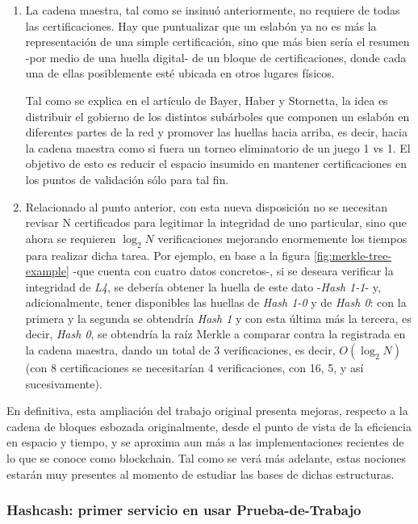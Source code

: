 \begin{enumerate}
  \item La cadena maestra, tal como se insinuó anteriormente, no requiere de todas las certificaciones. Hay que puntualizar que un eslabón ya no es más la representación de una simple certificación, sino que más bien sería el resumen -por medio de una huella digital- de un bloque de certificaciones, donde cada una de ellas posiblemente esté ubicada en otros lugares físicos.

    Tal como se explica en el artículo de Bayer, Haber y Stornetta, la idea es distribuir el gobierno de los distintos subárboles que componen un eslabón en diferentes partes de la red y promover las huellas hacia arriba, es decir, hacia la cadena maestra como si fuera un torneo eliminatorio de un juego 1 vs 1. El objetivo de esto es reducir el espacio insumido en mantener certificaciones en los puntos de validación sólo para tal fin.
  \item Relacionado al punto anterior, con esta nueva disposición no se necesitan revisar N certificados para legitimar la integridad de uno particular, sino que ahora se requieren $\log_2 N$ verificaciones mejorando enormemente los tiempos para realizar dicha tarea. Por ejemplo, en base a la figura \ref{fig:merkle-tree-example} -que cuenta con cuatro datos concretos-, si se deseara verificar la integridad de \textit{L4}, se debería obtener la huella de este dato -\textit{Hash 1-1}-  y, adicionalmente, tener disponibles las huellas de \textit{Hash 1-0} y de \textit{Hash 0}: con la primera y la segunda se obtendría \textit{Hash 1} y con esta última más la tercera, es decir, \textit{Hash 0}, se obtendría la raíz Merkle a comparar contra la registrada en la cadena maestra, dando un total de 3 verificaciones, es decir, $O(\log_2 N)$ (con 8 certificaciones se necesitarían 4 verificaciones, con 16, 5, y así sucesivamente).
\end{enumerate}

En definitiva, esta ampliación \cite{BayerHaberStornetta1993} del trabajo original \cite{Haber:1991:TDD:2724969.2725089} presenta mejoras, respecto a la cadena de bloques esbozada originalmente, desde el punto de vista de la eficiencia en espacio y tiempo, y se aproxima aun más a las implementaciones recientes de lo que se conoce como blockchain. Tal como se verá más adelante, estas nociones estarán muy presentes al momento de estudiar las bases de dichas estructuras.

\subsubsection{Hashcash: primer servicio en usar Prueba-de-Trabajo}
\label{bc_origins_hashcash}

